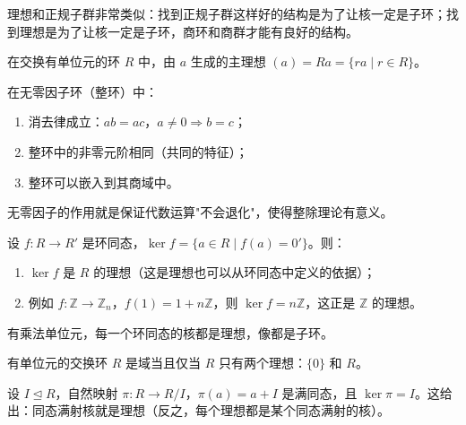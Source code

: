 \begin{note}
理想和正规子群非常类似：找到正规子群这样好的结构是为了让核一定是子环；找到理想是为了让核一定是子环，商环和商群才能有良好的结构。
\end{note}

\begin{proposition}[命题 2.10]
\end{proposition}

\begin{proposition}[命题 2.11：交换环的主理想可以写成 $Ra$]
在交换有单位元的环 $R$ 中，由 $a$ 生成的主理想 $(a) = Ra = \{ra \mid r \in R\}$。
\end{proposition}

\begin{theorem}[无零因子作用]
在无零因子环（整环）中：
\begin{enumerate}
  \item 消去律成立：$ab = ac$，$a \ne 0 \Rightarrow b = c$；
  \item 整环中的非零元阶相同（共同的特征）；
  \item 整环可以嵌入到其商域中。
\end{enumerate}
无零因子的作用就是保证代数运算"不会退化"，使得整除理论有意义。
\end{theorem}

\begin{lemma}
设 $f \colon R \to R'$ 是环同态，$\ker f = \{a \in R \mid f(a) = 0'\}$。则：
\begin{enumerate}
  \item $\ker f$ 是 $R$ 的理想（这是理想也可以从环同态中定义的依据）；
  \item 例如 $f \colon \mathbb{Z} \to \mathbb{Z}_n$，$f(1) = 1 + n\mathbb{Z}$，则 $\ker f = n\mathbb{Z}$，这正是 $\mathbb{Z}$ 的理想。
\end{enumerate}
有乘法单位元，每一个环同态的核都是理想，像都是子环。
\end{lemma}

\begin{theorem}[引理 2：交换环只有零理想和单位理想则是域]
有单位元的交换环 $R$ 是域当且仅当 $R$ 只有两个理想：$\{0\}$ 和 $R$。
\end{theorem}

\begin{theorem}
设 $I \trianglelefteq R$，自然映射 $\pi \colon R \to R/I$，$\pi(a) = a + I$ 是满同态，且 $\ker \pi = I$。这给出：同态满射核就是理想（反之，每个理想都是某个同态满射的核）。
\end{theorem}

